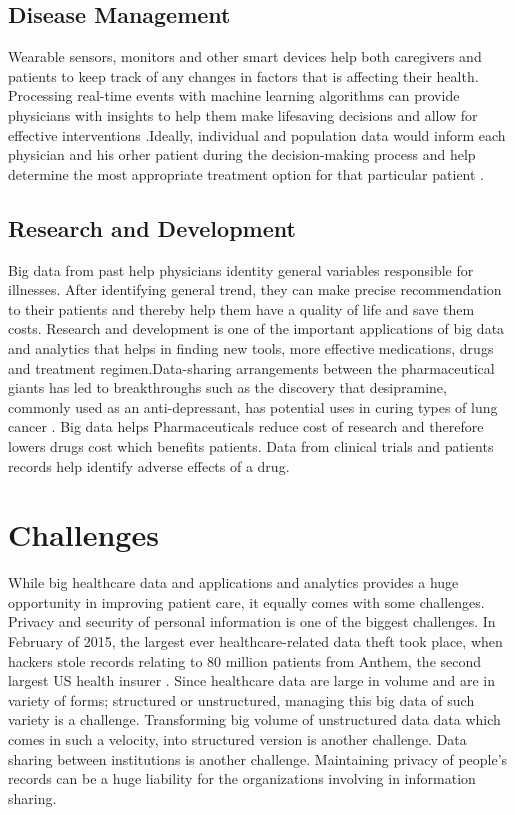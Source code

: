 \documentclass[sigconf]{acmart}
\begin{document}
\subsection{Disease Management} 
Wearable sensors, monitors and other smart devices help both caregivers and patients to keep track of any changes in factors 
that is affecting their health. Processing real-time events with machine learning algorithms can provide physicians with insights 
to help them make lifesaving decisions and allow for effective interventions \cite{www-mapr-com}.Ideally, individual and population 
data would inform each physician and his orher patient during the decision-making process and help determine the most 
appropriate treatment option for that particular patient \cite{www-link-springer-com}. 



\subsection{Research and Development}
Big data from past help physicians identity general variables responsible for illnesses. After identifying general trend, 
they can make precise recommendation to their patients and thereby help them have a quality of life and save them costs. 
Research and development is one of the important applications of big data and
analytics that helps in finding new tools, more effective medications, drugs 
and treatment regimen.Data-sharing arrangements between the pharmaceutical giants has led to breakthroughs such as the discovery 
that desipramine, commonly used as an anti-depressant, has potential uses in curing types of lung cancer \cite{www-forbes-com}. 
Big data helps Pharmaceuticals reduce cost of research and therefore lowers drugs cost which benefits patients. Data from 
clinical trials and patients records help identify adverse effects of a drug.
 
 




\section{Challenges}
While big healthcare data and applications and analytics provides a huge opportunity in improving patient care, it equally 
comes with some challenges. 
Privacy and security of personal information is one of the biggest challenges.
In February of 2015, the largest ever healthcare-related data theft took place, when hackers stole records relating to 80
million patients 
from Anthem, the second largest US health insurer \cite{www-forbes-com}.
Since healthcare data are large in volume and are in variety of forms; structured or unstructured, managing this big data of 
such variety is a challenge. Transforming big volume of unstructured data data which comes in such a velocity, into structured
version is another challenge. Data sharing between institutions is another challenge. Maintaining privacy of people's records 
can be a huge liability for the organizations involving in information sharing.
\end{document}
